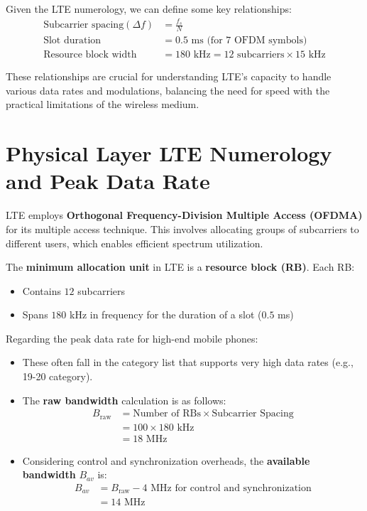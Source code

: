 Given the LTE numerology, we can define some key relationships:
\begin{align*}
    \text{Subcarrier spacing} (\Delta f) &= \frac{f_s}{N} \\
    \text{Slot duration} &= 0.5 \text{ ms (for 7 OFDM symbols)} \\
    \text{Resource block width} &= 180 \text{ kHz} = 12 \text{ subcarriers} \times 15 \text{ kHz}
\end{align*}

These relationships are crucial for understanding LTE's capacity to handle various data rates and modulations, balancing the need for speed with the practical limitations of the wireless medium.



\section*{Physical Layer LTE Numerology and Peak Data Rate}

LTE employs \textbf{Orthogonal Frequency-Division Multiple Access (OFDMA)} for its multiple access technique. This involves allocating groups of subcarriers to different users, which enables efficient spectrum utilization.

The \textbf{minimum allocation unit} in LTE is a \textbf{resource block (RB)}. Each RB:
\begin{itemize}
    \item Contains \(12\) subcarriers
    \item Spans \(180\) kHz in frequency for the duration of a slot (\(0.5\) ms)
\end{itemize}

Regarding the peak data rate for high-end mobile phones:
\begin{itemize}
    \item These often fall in the category list that supports very high data rates (e.g., 19-20 category).
    \item The \textbf{raw bandwidth} calculation is as follows:
          \begin{align*}
              B_{\text{raw}} &= \text{Number of RBs} \times \text{Subcarrier Spacing} \\
                             &= 100 \times 180\text{ kHz} \\
                             &= 18\text{ MHz}
          \end{align*}
    \item Considering control and synchronization overheads, the \textbf{available bandwidth} \(B_{av}\) is:
          \begin{align*}
              B_{av} &= B_{\text{raw}} - 4\text{ MHz for control and synchronization} \\
                     &= 14\text{ MHz}
          \end{align*}
\end{itemize}

